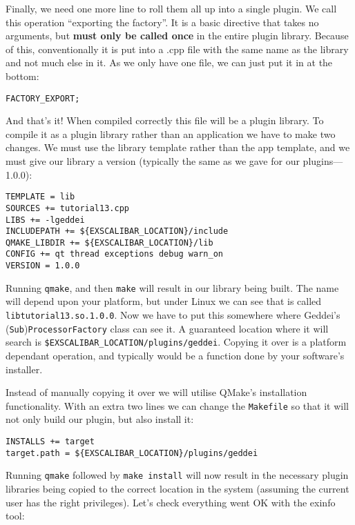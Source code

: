 Finally, we need one more line to roll them all up into a single plugin. We call this operation ``exporting the factory''. It is a basic directive that takes no arguments, but \textbf{must only be called once} in the entire plugin library. Because of this, conventionally it is put into a .cpp file with the same name as the library and not much else in it. As we only have one file, we can just put it in at the bottom:

\begin{verbatim}
FACTORY_EXPORT;
\end{verbatim}

And that's it! When compiled correctly this file will be a plugin library. To compile it as a plugin library rather than an application we have to make two changes. We must use the library template rather than the app template, and we must give our library a version (typically the same as we gave for our plugins---1.0.0):

\begin{verbatim}
TEMPLATE = lib
SOURCES += tutorial13.cpp
LIBS += -lgeddei
INCLUDEPATH += ${EXSCALIBAR_LOCATION}/include
QMAKE_LIBDIR += ${EXSCALIBAR_LOCATION}/lib
CONFIG += qt thread exceptions debug warn_on
VERSION = 1.0.0
\end{verbatim}

Running \texttt{qmake}, and then \texttt{make} will result in our library being built. The name will depend upon your platform, but under Linux we can see that is called \texttt{libtutorial13.so.1.0.0}. Now we have to put this somewhere where Geddei's (\texttt{Sub})\texttt{ProcessorFactory} class can see it. A guaranteed location where it will search is \texttt{\$EXSCALIBAR\_LOCATION/plugins/geddei}. Copying it over is a platform dependant operation, and typically would be a function done by your software's installer.

Instead of manually copying it over we will utilise QMake's installation functionality. With an extra two lines we can change the \texttt{Makefile} so that it will not only build our plugin, but also install it:

\begin{verbatim}
INSTALLS += target
target.path = ${EXSCALIBAR_LOCATION}/plugins/geddei
\end{verbatim}

Running \texttt{qmake} followed by \texttt{make install} will now result in the necessary plugin libraries being copied to the correct location in the system (assuming the current user has the right privileges). Let's check everything went OK with the exinfo tool:

